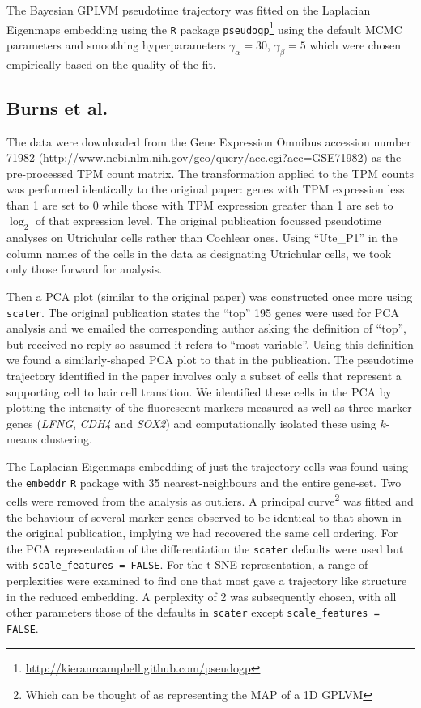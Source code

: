 The Bayesian GPLVM pseudotime trajectory was fitted on the Laplacian Eigenmaps embedding using the \texttt{R} package \texttt{pseudogp}\footnote{\url{http://kieranrcampbell.github.com/pseudogp}} using the default MCMC parameters and smoothing hyperparameters $\gamma_\alpha = 30$, $\gamma_\beta = 5$ which were chosen empirically based on the quality of the fit.

\subsection{Burns et al.}
The data were downloaded from the Gene Expression Omnibus accession number 71982 (\url{http://www.ncbi.nlm.nih.gov/geo/query/acc.cgi?acc=GSE71982}) as the pre-processed TPM count matrix. The transformation applied to the TPM counts was performed identically to the original paper: genes with TPM expression less than 1 are set to 0 while those with TPM expression greater than 1 are set to $\log_2$ of that expression level. The original publication focussed pseudotime analyses on Utrichular cells rather than Cochlear ones. Using ``Ute\_P1'' in the column names of the cells in the data as designating Utrichular cells, we took only those forward for analysis.

Then a PCA plot (similar to the original paper) was constructed once more using \texttt{scater}. The original publication states the ``top'' 195 genes were used for PCA analysis and we emailed the corresponding author asking the definition of ``top'', but received no reply so assumed it refers to ``most variable''. Using this definition we found a similarly-shaped PCA plot to that in the publication. The pseudotime trajectory identified in the paper involves only a subset of cells that represent a supporting cell to hair cell transition. We identified these cells in the PCA by plotting the intensity of the fluorescent markers measured as well as three marker genes (\emph{LFNG}, \emph{CDH4} and \emph{SOX2}) and computationally isolated these using $k$-means clustering.

The Laplacian Eigenmaps embedding of just the trajectory cells was found using the \texttt{embeddr} \texttt{R} package with 35 nearest-neighbours and the entire gene-set. Two cells were removed from the analysis as outliers. A principal curve\footnote{Which can be thought of as representing the MAP of a 1D GPLVM} was fitted and the behaviour of several marker genes observed to be identical to that shown in the original publication, implying we had recovered the same cell ordering. For the PCA representation of the differentiation the \texttt{scater} defaults were used but with \texttt{scale\_features = FALSE}. For the t-SNE representation, a range of perplexities were examined to find one that most gave a trajectory like structure in the reduced embedding. A perplexity of 2 was subsequently chosen, with all other parameters those of the defaults in \texttt{scater} except \texttt{scale\_features = FALSE}.


